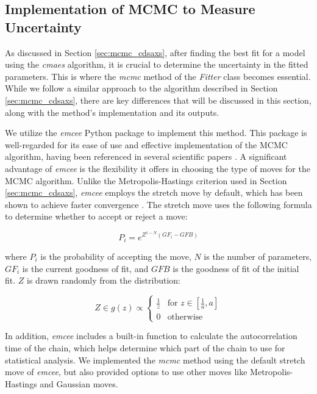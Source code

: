 \subsection{Implementation of MCMC to Measure Uncertainty}

As discussed in Section \ref{sec:mcmc_cdsaxs}, after finding the best fit for a model using the \textit{cmaes} algorithm, it is crucial to determine the uncertainty in the fitted parameters. This is where the \textit{mcmc} method of the \textit{Fitter} class becomes essential. While we follow a similar approach to the algorithm described in Section \ref{sec:mcmc_cdsaxs}, there are key differences that will be discussed in this section, along with the method's implementation and its outputs.

\medskip

We utilize the \textit{emcee} Python package \cite{emcee} to implement this method. This package is well-regarded for its ease of use and effective implementation of the MCMC algorithm, having been referenced in several scientific papers \cite{emcee_refed}. A significant advantage of \textit{emcee} is the flexibility it offers in choosing the type of moves for the MCMC algorithm. Unlike the Metropolis-Hastings criterion used in Section \ref{sec:mcmc_cdsaxs}, \textit{emcee} employs the stretch move by default, which has been shown to achieve faster convergence \cite{goodman2010_strech_move,emcee}. The stretch move uses the following formula to determine whether to accept or reject a move:

\begin{equation}
    P_{i} = e^{Z^{1-N} (GF_{i} -GFB)}
\end{equation}

where \(P_{i}\) is the probability of accepting the move, \(N\) is the number of parameters, \(GF_{i}\) is the current goodness of fit, and \(GFB\) is the goodness of fit of the initial fit. \(Z\) is drawn randomly from the distribution:

\begin{equation}
    Z \in g(z) \propto 
    \begin{cases} 
      \frac{1}{z} & \text{for } z \in \left[\frac{1}{a}, a\right] \\
      0 & \text{otherwise}
    \end{cases}
\end{equation}

\medskip

In addition, \textit{emcee} includes a built-in function to calculate the autocorrelation time of the chain, which helps determine which part of the chain to use for statistical analysis. We implemented the \textit{mcmc} method using the default stretch move of \textit{emcee}, but also provided options to use other moves like Metropolis-Hastings and Gaussian moves.

